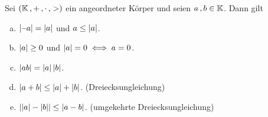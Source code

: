 \documentclass[../ana1.tex]{subfiles}
\begin{document}
\begin{satz}\label{satz:bgleichungen}
	Sei \((\mathbb{K} \operatorname{,} + \operatorname{,} \cdot \operatorname{,} >)\) ein angeordneter Körper und seien \(a \operatorname{,} b \in \mathbb{K}\). Dann gilt
	\begin{enumerate}[(a)]
		\item \(\abs{\minus a} = \abs{a}\) und \(a \leq \left|a\right|\).
		\item \(\left|a\right| \geq 0\) und \(\left|a\right| = 0 \iff a = 0\).
		\item \(\left|ab\right| = \left|a\right|\left|b\right|\).
		\item \(\left|a + b\right| \leq \left|a\right| + \left|b\right|\). (Dreiecksungleichung)
		\item \(\left|\left|a\right| - \left|b\right|\right| \leq \left|a - b\right|\). (umgekehrte Dreiecksungleichung)
	\end{enumerate}
\end{satz}
\end{document}
